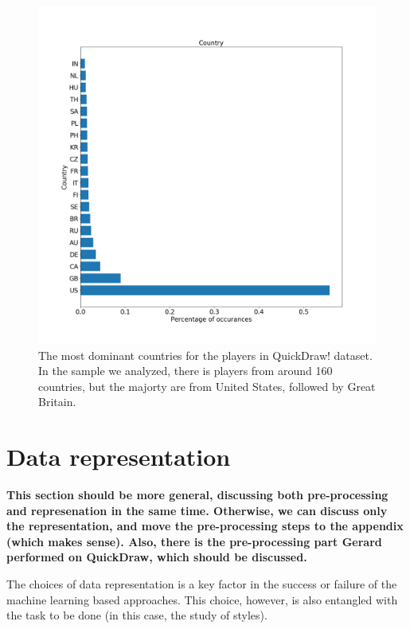 \begin{figure}
    \centering
    \includegraphics[scale=0.4]{images/dataset/quickdraw_countries.png}
    \caption{The most dominant countries for the players in QuickDraw! dataset. In the sample we analyzed, there is players from around 160 countries, but the majorty are from United States, followed by Great Britain.}
    \label{fig:quickdraw_countries}
\end{figure}



\section{Data representation}\label{sec:data_representation}
  \textbf{This section should be more general, discussing both pre-processing and represenation in the same time. Otherwise, we can discuss only the representation, and move the pre-processing steps to the appendix (which makes sense). Also, there is the pre-processing part Gerard performed on QuickDraw, which should be discussed.}

  The choices of data representation is a key factor in the success or failure of the machine learning based approaches. This choice, however, is also entangled with the task to be done (in this case, the study of styles).

